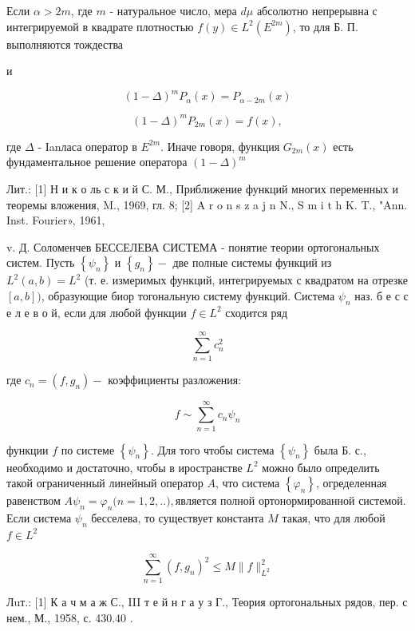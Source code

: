 \documentclass[10pt]{article}
\begin{document}
Если $\alpha>2 m$, где $m$ - натуральное число, мера $d \mu$ абсолютно непрерывна с интегрируемой в квадрате плотностью $f(y) \in L^{2}\left(E^{2 m}\right)$, то для Б. П. выполняются тождества



и



\[

(1-\Delta)^{m} P_{\alpha}(x)=P_{\alpha-2 m}(x)

\]



\[

(1-\Delta)^{m} P_{2 m}(x)=f(x),

\]



где $\Delta$ - Ianласа оператор в $E^{2 m}$. Иначе говоря, функция $G_{2 m}(x)$ есть фундаментальное решение оператора $(1-\Delta)^{m}$



Лит.: [1] Н и к о ль с к и й С. М., Приближение функций многих переменных и теоремы вложения, M., 1969, гл. 8; [2] A r o n s z a j n N., S m i t h K. T., "Ann. Inst. Fourier», 1961,

v. Д. Соломенчев БЕССЕЛЕВА СИСТЕМА - понятие теории ортогональных систем. Пусть $\left\{\psi_{n}\right\}$ и $\left\{g_{n}\right\}-$ две полные системы функций из $L^{2}(a, b)=L^{2}$ (т. е. измеримых функций, интегрируемых с квадратом на отрезке $[a, b])$, образующие биор тогональную систему функций. Система $\psi_{n}$ наз. б е с с е л е в о й, если для любой функции $f \in L^{2}$ сходится ряд



\[

\sum_{n=1}^{\infty} c_{n}^{2}

\]



где $c_{n}=\left(f, g_{n}\right)-$ коэффициенты разложения:



\[

f \sim \sum_{n=1}^{\infty} c_{n} \psi_{n}

\]



функции $f$ по системе $\left\{\psi_{n}\right\}$. Для того чтобы система $\left\{\psi_{n}\right\}$ была Б. с., необходимо и достаточно, чтобы в иространстве $L^{2}$ можно было определить такой ограниченный линейный оператор $A$, что система $\left\{\varphi_{n}\right\}$, огределенная равенством $A \psi_{n}=\varphi_{n}(n=1,2, .$.$) , является$ полной ортонормированной системой. Если система $\psi_{n}$ бесселева, то существует константа $M$ такая, что для любой $f \in L^{2}$



\[

\sum_{n=1}^{\infty}\left(f, g_{n}\right)^{2} \leqslant M\|f\|_{L^{2}}^{2}

\]



Лuт.: [1] К а ч м а ж С., III т е й н г а у з Г., Теория ортогональных рядов, пер. с нем., М., 1958, с. 430.40 .
\end{document}
